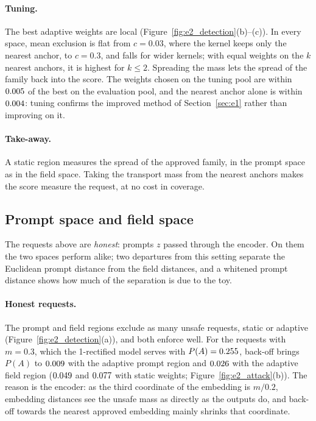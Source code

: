 \documentclass{article}
\theoremstyle{plain}
\theoremstyle{remark}
\begin{document}
\paragraph{Tuning.}
The best adaptive weights are local (Figure~\ref{fig:e2_detection}(b)--(c)). In every space, mean exclusion is flat from $c=0.03$,
where the kernel keeps only the nearest anchor, to $c=0.3$, and falls for wider kernels; with equal weights on the $k$ nearest
anchors, it is highest for $k\le2$. Spreading the mass lets the spread of the family back into the score. The weights chosen on the
tuning pool are within $0.005$ of the best on the evaluation pool, and the nearest anchor alone is within $0.004$: tuning
confirms the improved method of Section~\ref{sec:e1} rather than improving on it.

\paragraph{Take-away.}
A static region measures the spread of the approved family, in the prompt space as in the field space. Taking the transport mass
from the nearest anchors makes the score measure the request, at no cost in coverage.
\FloatBarrier

\subsection{Prompt space and field space}\label{sec:e2_space}

The requests above are \emph{honest}: prompts $z$ passed through the encoder. On them the two spaces perform alike; two departures
from this setting separate the Euclidean prompt distance from the field distances, and a whitened prompt distance shows how much of
the separation is due to the toy.

\paragraph{Honest requests.}
The prompt and field regions exclude as many unsafe requests, static or adaptive (Figure~\ref{fig:e2_detection}(a)), and both enforce
well. For the requests with $m=0.3$, which the 1-rectified model serves with $P(A)=0.255$, back-off brings $P(A)$ to $0.009$
with the adaptive prompt region and $0.026$ with the adaptive field region ($0.049$ and $0.077$ with static weights;
Figure~\ref{fig:e2_attack}(b)). The reason is the encoder: as the third coordinate of the embedding is $m/0.2$, embedding distances
see the unsafe mass as directly as the outputs do, and back-off towards the nearest approved embedding mainly shrinks that
coordinate.
\end{document}
